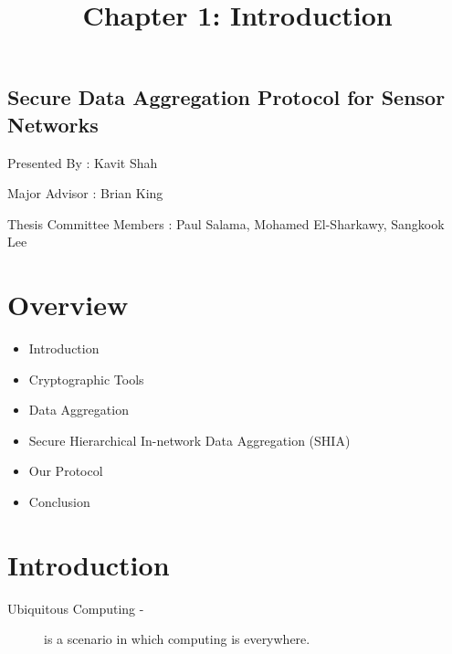 \documentclass[%
  slidesonly,%
  semlayer%
  ]{seminar}                                  %
\title{Chapter 1: Introduction}
\author{}
\date{}
\date{}
\begin{document}


\maketitle          %

\begin{slide}
  \ifslidesonly              %
    \addtocounter{slide}{-1}
  \fi
\end{slide}


\begin{slide}

\footnotesize

\begin{center}
\section*{Secure Data Aggregation Protocol for Sensor Networks}
  \vfill
  Presented By : Kavit Shah

  Major Advisor : Brian King
  
  Thesis Committee Members : Paul Salama, Mohamed El-Sharkawy, Sangkook Lee
  \vfill
  \end{center}
  \clearpage

\section*{Overview}
  \vfill
  \begin{center}
    \begin{itemize}
      \item Introduction
      \item Cryptographic Tools
      \item Data Aggregation
      \item Secure Hierarchical In-network Data Aggregation (SHIA)
      \item Our Protocol
      \item Conclusion
    \end{itemize}
  \end{center}
  \vfill
  \clearpage

\section*{Introduction}
  \vfill
  \begin{description}
    \item[Ubiquitous Computing -] is a scenario in which computing is everywhere.


\end{description}
\end{slide}
\end{document}
